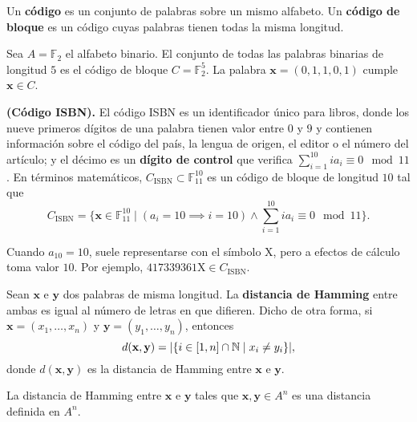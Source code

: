 \begin{definition}
	Un \textbf{código} es un conjunto de palabras sobre un mismo alfabeto. Un \textbf{código de bloque} es un código cuyas palabras tienen todas la misma longitud.
\end{definition}

\begin{example}
	Sea $A = \mathbb{F}_2$ el alfabeto binario. El conjunto de todas las palabras binarias de longitud $5$ es el código de bloque $C = \mathbb{F}_2^5$. La palabra $\textbf{x} = (0, 1, 1, 0, 1)$ cumple $\textbf{x} \in C$.
\end{example}

\begin{example} \textbf{(Código ISBN).}
	El código ISBN es un identificador único para libros, donde los nueve primeros dígitos de una palabra tienen valor entre $0$ y $9$ y contienen información sobre el código del país, la lengua de origen, el editor o el número del artículo; y el décimo es un \textbf{dígito de control} que verifica $\sum_{i=1}^{10} ia_i \equiv 0 \mod 11$. En términos matemáticos, $C_{\textrm{ISBN}}\subset\mathbb{F}_{11}^{10}$ es un código de bloque de longitud $10$ tal que
	\[C_{\textrm{ISBN}} = \{\textbf{x}\in\mathbb{F}_{11}^{10} \mid (a_i = 10 \implies i = 10) \wedge \sum_{i=1}^{10}ia_i \equiv 0 \mod 11\}.\]
	\begin{remark}
		Cuando $a_{10} = 10$, suele representarse con el símbolo $\textrm{X}$, pero a efectos de cálculo toma valor $10$. Por ejemplo, $\textrm{417339361X} \in C_{\textrm{ISBN}}$.
	\end{remark}
\end{example}

\begin{definition}
	Sean $\textbf{x}$ e $\textbf{y}$ dos palabras de misma longitud. La \textbf{distancia de Hamming} entre ambas es igual al número de letras en que difieren. Dicho de otra forma, si $\textbf{x} = (x_1, \hdots, x_n)$ y $\textbf{y} = (y_1, \hdots, y_n)$, entonces
	\[d(\textbf{x}, \textbf{y}) = |\{i\in[1, n]\cap\mathbb{N} \mid x_i \neq y_i\}|,\]
	donde $d(\textbf{x}, \textbf{y})$ es la distancia de Hamming entre $\textbf{x}$ e $\textbf{y}$.
\end{definition}

\begin{theorem}
	La distancia de Hamming entre  $\textbf{x}$ e $\textbf{y}$ tales que $\textbf{x}, \textbf{y} \in A^n$ es una distancia definida en $A^n$.
\end{theorem}

